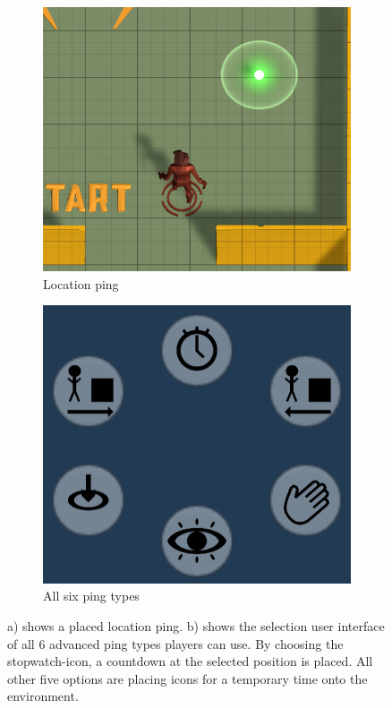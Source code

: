 \begin{figure}[h!]
    \centering
    \begin{subfigure}[b]{0.4\linewidth}
        \includegraphics[width=\linewidth]{images/location_ping.png}
        \caption{Location ping}
        \label{fig:location ping}
      \end{subfigure}
    \begin{subfigure}[b]{0.4\linewidth}
        \includegraphics[width=\linewidth]{images/ping_types.png}
        \caption{All six ping types}
        \label{fig:ping types}
    \end{subfigure}
    \caption{ a) shows a placed location ping. 
    b) shows the selection user interface of all 6 advanced ping types players can use. By choosing the stopwatch-icon, a countdown at the selected position is placed. All other five options are placing icons for a temporary time onto the environment.}
\end{figure}

